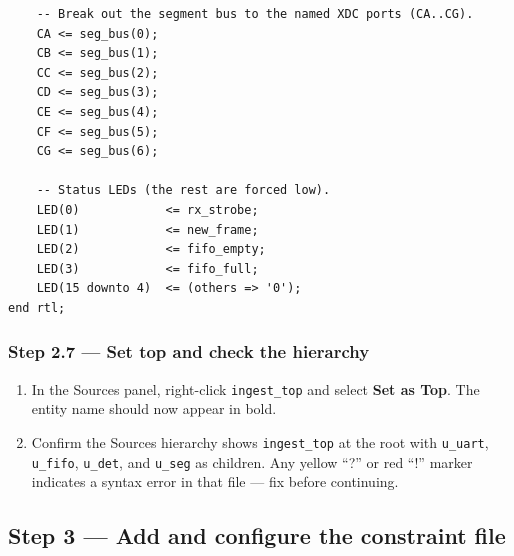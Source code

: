 \documentclass[11pt,letterpaper]{article}
\begin{document}
\begin{lstlisting}
    -- Break out the segment bus to the named XDC ports (CA..CG).
    CA <= seg_bus(0);
    CB <= seg_bus(1);
    CC <= seg_bus(2);
    CD <= seg_bus(3);
    CE <= seg_bus(4);
    CF <= seg_bus(5);
    CG <= seg_bus(6);

    -- Status LEDs (the rest are forced low).
    LED(0)            <= rx_strobe;
    LED(1)            <= new_frame;
    LED(2)            <= fifo_empty;
    LED(3)            <= fifo_full;
    LED(15 downto 4)  <= (others => '0');
end rtl;
\end{lstlisting}

\subsubsection*{Step 2.7 --- Set top and check the hierarchy}

\begin{enumerate}[leftmargin=2em]
	\item In the Sources panel, right-click \texttt{ingest\_top} and select \textbf{Set as Top}. The entity name should now appear in bold.
	\item Confirm the Sources hierarchy shows \texttt{ingest\_top} at the root with \texttt{u\_uart}, \texttt{u\_fifo}, \texttt{u\_det}, and \texttt{u\_seg} as children. Any yellow ``?'' or red ``!'' marker indicates a syntax error in that file --- fix before continuing.
\end{enumerate}

\newpage
\subsection{Step 3 --- Add and configure the constraint file}
\end{document}

